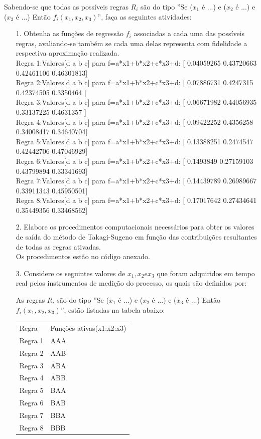\documentclass{report}
\begin{document}
Sabendo-se que todas as possíveis regras $R_i$ são do tipo ''Se ($x_1$ é ...) e ($x_2$ é ...) e ($x_3$ é ...)
Então $f_i(x_1, x_2, x_3)$'', faça as seguintes atividades:

\begin{enumerate}
\item[1.] Obtenha as funções de regressão $f_i$ associadas a cada uma das possíveis regras, avaliando-se
também se cada uma delas representa com fidelidade a respectiva aproximação realizada.\\
Regra 1:Valores[d a b c] para f=a*x1+b*x2+c*x3+d: [ 0.04059265  0.43720663  0.42461106  0.46301813] \\
Regra 2:Valores[d a b c] para f=a*x1+b*x2+c*x3+d: [ 0.07886731  0.4247315   0.42374505  0.3350464 ] \\
Regra 3:Valores[d a b c] para f=a*x1+b*x2+c*x3+d: [ 0.06671982  0.44056935  0.33137225  0.4631357 ] \\
Regra 4:Valores[d a b c] para f=a*x1+b*x2+c*x3+d: [ 0.09422252  0.4356258   0.34008417  0.34640704] \\
Regra 5:Valores[d a b c] para f=a*x1+b*x2+c*x3+d: [ 0.13388251  0.2474547   0.42442706  0.47046929] \\
Regra 6:Valores[d a b c] para f=a*x1+b*x2+c*x3+d: [ 0.1493849   0.27159103  0.43799894  0.33341693] \\
Regra 7:Valores[d a b c] para f=a*x1+b*x2+c*x3+d: [ 0.14439789  0.26989667  0.33911343  0.45950501] \\
Regra 8:Valores[d a b c] para f=a*x1+b*x2+c*x3+d: [ 0.17017642  0.27434641  0.35449356  0.33468562] \\

\item[2.] Elabore os procedimentos computacionais necessários para obter os valores de saída do
método de Takagi-Sugeno em função das contribuições resultantes de todas as regras
ativadas.\\
Os procedimentos estão no código anexado.

\item[3.] Considere os seguintes valores de $x_1, x_2 e x_3$ que foram adquiridos em tempo real pelos
instrumentos de medição do processo, os quais são definidos por:

As regras $R_i$ são do tipo ''Se ($x_1$ é ...) e ($x_2$ é ...) e ($x_3$ é ...)
Então $f_i(x_1, x_2, x_3)$'', estão listadas na tabela abaixo:\\

\begin{center}
\begin{tabular}{ll}
Regra & Funções ativas(x1:x2:x3)\\
Regra 1 & AAA\\
Regra 2 & AAB\\
Regra 3 & ABA\\
Regra 4 & ABB\\
Regra 5 & BAA\\
Regra 6 & BAB\\
Regra 7 & BBA\\
Regra 8 & BBB
\end{tabular}
\end{center}


\end{enumerate}
\end{document}
